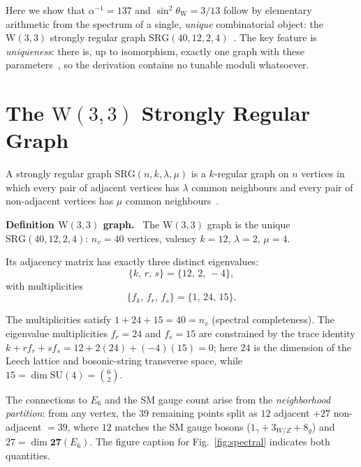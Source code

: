 \documentclass[aps,prl,twocolumn,showpacs,preprintnumbers,amsmath,amssymb]{revtex4-2}
\newcommand{\W}{\mathrm{W}(3,3)}
\newcommand{\SRG}{\mathrm{SRG}}
\newcommand{\alphafs}{\alpha^{-1}}
\newcommand{\sinW}{\sin^2\!\theta_{\mathrm{W}}}
\newcounter{prlthm}
\newenvironment{definition}[1][]{\par\medskip\refstepcounter{prlthm}%
  \noindent\textbf{Definition \theprlthm#1.}\ }{\par\medskip}
\begin{document}
Here we show that $\alphafs = 137$ and $\sinW = 3/13$ follow
by elementary arithmetic from the spectrum of a single, \emph{unique}
combinatorial object: the $\W$ strongly regular graph
$\SRG(40,12,2,4)$~\cite{Brouwer1989}.  The key feature is
\emph{uniqueness}: there is, up to isomorphism, exactly one graph
with these parameters~\cite{Paulus1973}, so the derivation contains
no tunable moduli whatsoever.

\section{The $\W$ Strongly Regular Graph}
\label{sec:graph}

A strongly regular graph $\SRG(n,k,\lambda,\mu)$ is a $k$-regular graph
on $n$ vertices in which every pair of adjacent vertices has $\lambda$
common neighbours and every pair of non-adjacent vertices has $\mu$
common neighbours~\cite{Brouwer1989}.

\begin{definition}[$\W$ graph]
The $\W$ graph is the unique $\SRG(40,12,2,4)$: $n_v=40$ vertices,
valency $k=12$, $\lambda=2$, $\mu=4$.
\end{definition}

Its adjacency matrix has exactly three distinct eigenvalues:
\begin{equation}
  \{k,\,r,\,s\} = \{12,\,2,\,-4\},
  \label{eq:eigenvalues}
\end{equation}
with multiplicities
\begin{equation}
  \{f_k,\,f_r,\,f_s\} = \{1,\,24,\,15\}.
  \label{eq:multiplicities}
\end{equation}

The multiplicities satisfy $1 + 24 + 15 = 40 = n_v$ (spectral
completeness).  The eigenvalue multiplicities $f_r=24$ and $f_s=15$
are constrained by the trace identity
$k + r f_r + s f_s = 12 + 2(24) + (-4)(15) = 0$; here $24$ is the
dimension of the Leech lattice and bosonic-string transverse space,
while $15 = \dim\mathrm{SU}(4) = \binom{6}{2}$.

The connections to $E_6$ and the SM gauge count arise from the
\emph{neighborhood partition}: from any vertex, the 39 remaining
points split as $12$ adjacent $+ 27$ non-adjacent $= 39$, where $12$
matches the SM gauge bosons ($1_\gamma+3_{W/Z}+8_g$) and $27 =
\dim\mathbf{27}(E_6)$.  The figure caption for Fig.~\ref{fig:spectral}
indicates both quantities.
\end{document}

